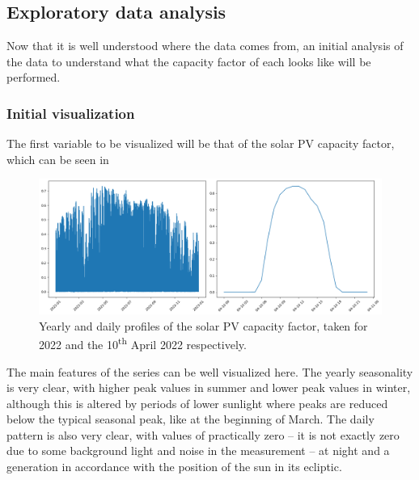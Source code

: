 \subsection{Exploratory data analysis}

Now that it is well understood where the data comes from, an initial analysis of the data to understand what the capacity factor of each looks like will be performed. 

\subsubsection{Initial visualization}
The first variable to be visualized will be that of the solar PV capacity factor, which can be seen in 
\begin{figure}[ht]
    \centering
    \captionsetup{justification=centering}
    \includegraphics[width=\linewidth]{assets/spv-year-day.png}
    \caption{Yearly and daily profiles of the solar PV capacity factor, taken for 2022 and the 10\textsuperscript{th} April 2022 respectively.}
    \label{fig:spv-year-day}
\end{figure}

The main features of the series can be well visualized here. The yearly seasonality is very clear, with higher peak values in summer and lower peak values in winter, although this is altered by periods of lower sunlight where peaks are reduced below the typical seasonal peak, like at the beginning of March. The daily pattern is also very clear, with values of practically zero -- it is not exactly zero due to some background light and noise in the measurement -- at night and a generation in accordance with the position of the sun in its ecliptic. 


